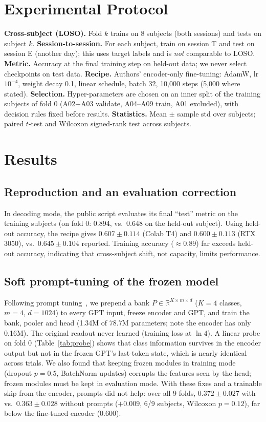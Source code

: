 \documentclass[conference]{IEEEtran}
\begin{document}
\section{Experimental Protocol}
\textbf{Cross-subject (LOSO).} Fold $k$ trains on 8 subjects (both sessions) and tests on subject $k$. \textbf{Session-to-session.}
For each subject, train on session T and test on session E (another day); this uses target labels and is \emph{not}
comparable to LOSO. \textbf{Metric.} Accuracy at the final training step on held-out data; we never select checkpoints
on test data. \textbf{Recipe.} Authors' encoder-only fine-tuning: AdamW, lr $10^{-4}$, weight decay 0.1, linear schedule,
batch 32, 10,000 steps (5,000 where stated). \textbf{Selection.} Hyper-parameters are chosen on an inner split of the
training subjects of fold 0 (A02+A03 validate, A04--A09 train, A01 excluded), with decision rules fixed before results.
\textbf{Statistics.} Mean $\pm$ sample std over subjects; paired $t$-test and Wilcoxon signed-rank test across subjects.

\section{Results}
\subsection{Reproduction and an evaluation correction}\label{sec:repro}
In decoding mode, the public script evaluates its final ``test'' metric on the training subjects (on fold 0: 0.894,
vs.\ 0.648 on the held-out subject). Using held-out accuracy, the recipe gives $0.607\pm0.114$ (Colab T4) and
$0.600\pm0.113$ (RTX 3050), vs.\ $0.645\pm0.104$ reported. Training accuracy ($\approx$0.89) far exceeds held-out
accuracy, indicating that cross-subject shift, not capacity, limits performance.

\subsection{Soft prompt-tuning of the frozen model}\label{sec:prompt}
Following prompt tuning~\cite{lester2021prompt,li2021prefix}, we prepend a bank $P\in\mathbb{R}^{K\times m\times d}$
($K{=}4$ classes, $m{=}4$, $d{=}1024$) to every GPT input, freeze encoder and GPT, and train the bank, pooler and head
(1.34M of 78.7M parameters; note the encoder has only 0.16M). The original readout never learned (training loss at
$\ln 4$). A linear probe on fold 0 (Table~\ref{tab:probe}) shows that class information survives in the encoder output but
not in the frozen GPT's last-token state, which is nearly identical across trials. We also found that keeping frozen
modules in training mode (dropout $p{=}0.5$, BatchNorm updates) corrupts the features seen by the head; frozen modules
must be kept in evaluation mode. With these fixes and a trainable skip from the encoder, prompts did not help: over all 9
folds, $0.372\pm0.027$ with vs.\ $0.363\pm0.028$ without prompts ($+0.009$, 6/9 subjects, Wilcoxon $p=0.12$), far below
the fine-tuned encoder (0.600).
\end{document}

